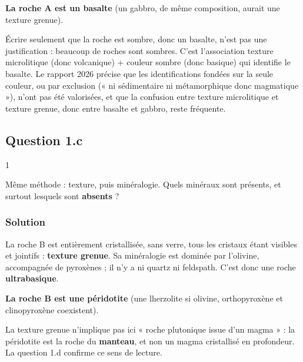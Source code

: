 \documentclass[11pt,a4paper]{article}
\begin{document}
\textbf{La roche A est un basalte} (un gabbro, de même composition, aurait une texture grenue).

\begin{piege}

Écrire seulement que la roche est sombre, donc un basalte, n'est pas une justification : beaucoup de roches sont sombres. C'est l'association texture microlitique (donc volcanique) + couleur sombre (donc basique) qui identifie le basalte. Le rapport 2026 précise que les identifications fondées sur la seule couleur, ou par exclusion (« ni sédimentaire ni métamorphique donc magmatique »), n'ont pas été valorisées, et que la confusion entre texture microlitique et texture grenue, donc entre basalte et gabbro, reste fréquente.

\end{piege}

\hypertarget{question-1.c}{%
\subsection{Question 1.c}\label{question-1.c}}

\begin{indication}{1}

Même méthode : texture, puis minéralogie. Quels minéraux sont présents, et surtout lesquels sont \textbf{absents} ?

\end{indication}

\hypertarget{solution-2}{%
\subsubsection{Solution}\label{solution-2}}

La roche B est entièrement cristallisée, sans verre, tous les cristaux étant visibles et jointifs : \textbf{texture grenue}. Sa minéralogie est dominée par l'olivine, accompagnée de pyroxènes ; il n'y a ni quartz ni feldspath. C'est donc une roche \textbf{ultrabasique}.

\textbf{La roche B est une péridotite} (une lherzolite si olivine, orthopyroxène et clinopyroxène coexistent).

\begin{piege}

La texture grenue n'implique pas ici « roche plutonique issue d'un magma » : la péridotite est la roche du \textbf{manteau}, et non un magma cristallisé en profondeur. La question 1.d confirme ce sens de lecture.

\end{piege}
\end{document}
